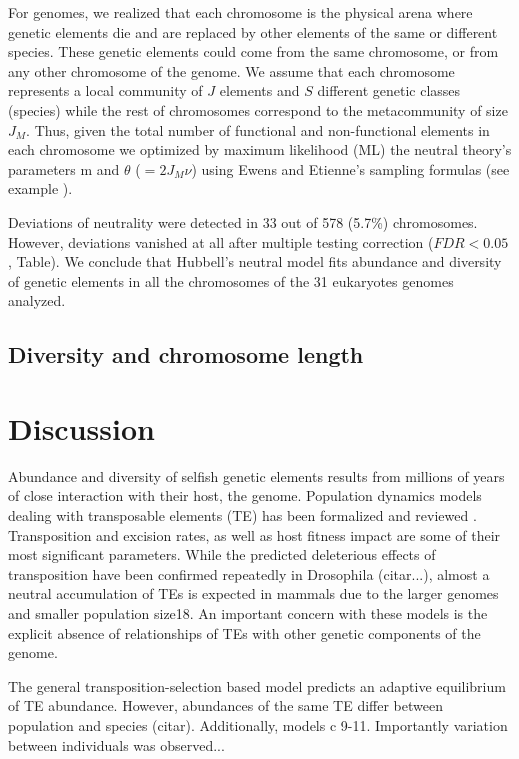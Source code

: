 For genomes, we realized that each chromosome is the physical arena where genetic elements die and are replaced by other elements of the same or different species. These genetic elements could come from the same chromosome, or from any other chromosome of the genome. We assume that each chromosome represents a local community of $J$ elements and $S$ different genetic classes (species) while the rest of chromosomes correspond to the metacommunity of size $J_M$. Thus, given the total number of functional and non-functional elements in each chromosome we optimized by maximum likelihood (ML) the neutral theory's parameters m and $\theta$ ($= 2 J_M\nu$) using Ewens and Etienne's sampling formulas (see example ).

Deviations of neutrality were detected in 33 out of 578 (5.7\%) chromosomes. However, deviations vanished at all after multiple testing correction ($FDR< 0.05$, Table). We conclude that Hubbell's neutral model fits abundance and diversity of genetic elements in all the chromosomes of the 31 eukaryotes genomes analyzed. 


\subsection{Diversity and chromosome length}

\section{Discussion}

Abundance and diversity of selfish genetic elements \cite{Doolittle1980,Orgel1980} results from millions of years of close interaction with their host, the genome. Population dynamics models dealing with transposable elements (TE) has been formalized and reviewed \cite{Charlesworth2009,Charlesworth1994,LeRouzic2005}. Transposition and excision rates, as well as host fitness impact are some of their most significant parameters. While the predicted deleterious effects of transposition have been confirmed repeatedly in Drosophila (citar...), almost a neutral accumulation of TEs is expected in mammals due to the larger genomes and smaller population size18. An important concern with these models is the explicit absence of relationships of TEs with other genetic components of the genome. 

The general transposition-selection based model predicts an adaptive equilibrium of TE abundance. However, abundances of the same TE differ between population and species (citar). 
Additionally, models c 9-11. Importantly variation between individuals was observed...\cite{Brookfield2005}

